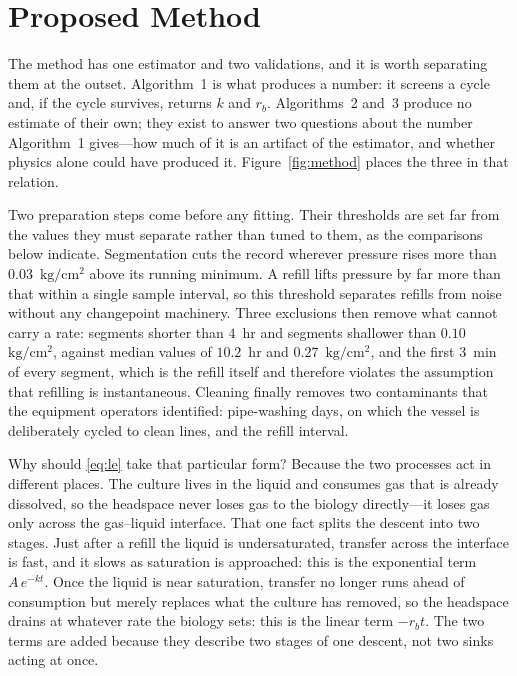 \documentclass[sigconf]{acmart}
\newcommand{\pu}{\ensuremath{\mathrm{kg/cm^{2}}}}
\newcommand{\rb}{\ensuremath{r_{b}}}
\begin{document}
\section{Proposed Method}
\label{sec:method}

The method has one estimator and two validations, and it is worth
separating them at the outset. Algorithm~1 is what produces a number:
it screens a cycle and, if the cycle survives, returns $k$ and \rb{}.
Algorithms~2 and~3 produce no estimate of their own; they exist to
answer two questions about the number Algorithm~1 gives---how much of
it is an artifact of the estimator, and whether physics alone could
have produced it. Figure~\ref{fig:method} places the three in that
relation.

Two preparation steps come before any fitting. Their thresholds are set
far from the values they must separate rather than tuned to them, as
the comparisons below indicate.
Segmentation cuts the record wherever pressure rises more than
$0.03$~\pu{} above its running minimum. A refill lifts pressure by far
more than that within a single sample interval, so this threshold
separates refills from noise without any changepoint machinery. Three
exclusions then remove what cannot carry a rate: segments shorter than
$4$~hr and segments shallower than $0.10$~\pu{}, against median values
of $10.2$~hr and $0.27$~\pu{}, and the first $3$~min of every segment,
which is the refill itself and therefore violates the assumption that
refilling is instantaneous. Cleaning finally removes two contaminants
that the equipment operators identified: pipe-washing days, on which
the vessel is deliberately cycled to clean lines, and the refill
interval.

Why should \eqref{eq:le} take that particular form? Because the two
processes act in different places. The culture lives in the liquid and
consumes gas that is already dissolved, so the headspace never loses
gas to the biology directly---it loses gas only across the gas--liquid
interface. That one fact splits the descent into two stages. Just after
a refill the liquid is undersaturated, transfer across the interface is
fast, and it slows as saturation is approached: this is the exponential
term $A\,e^{-kt}$. Once the liquid is near saturation, transfer no
longer runs ahead of consumption but merely replaces what the culture
has removed, so the headspace drains at whatever rate the biology sets:
this is the linear term $-\rb t$. The two terms are added because they
describe two stages of one descent, not two sinks acting at once.
\end{document}
